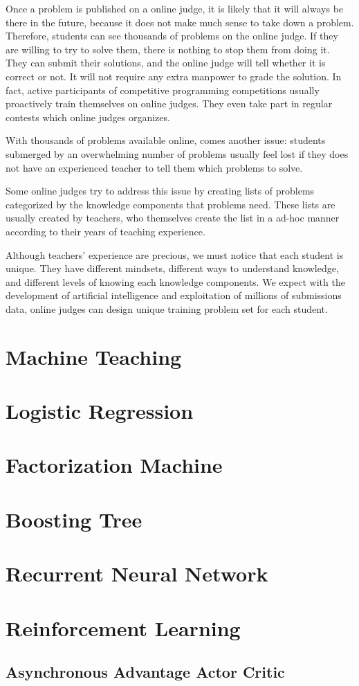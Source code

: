             Once a problem is published on a online judge,
            it is likely that it will always be there in the future,
            because it does not make much sense to take down a problem.
            Therefore, students can see thousands of problems on the online judge.
            If they are willing to try to solve them,
            there is nothing to stop them from doing it.
            They can submit their solutions,
            and the online judge will tell whether it is correct or not.
            It will not require any extra manpower to grade the solution.
            In fact, active participants of competitive programming competitions usually proactively
            train themselves on online judges.
            They even take part in regular contests which online judges organizes.

            With thousands of problems available online, comes another issue:
            students submerged by an overwhelming number of problems usually feel lost
            if they does not have an experienced teacher to tell them which problems to solve.

            Some online judges try to address this issue by creating lists of problems
            categorized by the knowledge components that problems need.
            These lists are usually created by teachers,
            who themselves create the list in a ad-hoc manner
            according to their years of teaching experience.

            Although teachers' experience are precious,
            we must notice that each student is unique.
            They have different mindsets, different ways to understand knowledge,
            and different levels of knowing each knowledge components.
            We expect with the development of artificial intelligence
            and exploitation of millions of submissions data,
            online judges can design unique training problem set for each student.


\section{Machine Teaching}

\section{Logistic Regression}

\section{Factorization Machine}

\section{Boosting Tree}

\section{Recurrent Neural Network}

\section{Reinforcement Learning}

    \subsection{Asynchronous Advantage Actor Critic}
